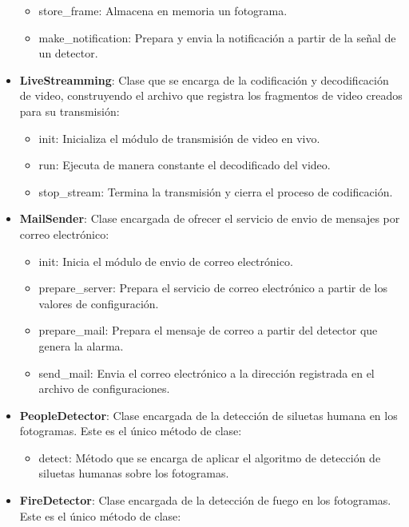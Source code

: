 \begin{itemize}
\begin{itemize}
            \item store\_frame: Almacena en memoria un fotograma.
            \item make\_notification: Prepara y envia la notificación a partir de la señal de un detector.
        \end{itemize}
    \item \textbf{LiveStreamming}: Clase que se encarga de la codificación y decodificación de video, construyendo el archivo que registra los fragmentos de video creados para su transmisión:
        \begin{itemize}
            \item init: Inicializa el módulo de transmisión de video en vivo.
            \item run: Ejecuta de manera constante el decodificado del video.
            \item stop\_stream: Termina la transmisión y cierra el proceso de codificación.
        \end{itemize}
    \item \textbf{MailSender}: Clase encargada de ofrecer el servicio de envio de mensajes por correo electrónico:
        \begin{itemize}
            \item init: Inicia el módulo de envio de correo electrónico.
            \item prepare\_server: Prepara el servicio de correo electrónico a partir de los valores de configuración.
            \item prepare\_mail: Prepara el mensaje de correo a partir del detector que genera la alarma.
            \item send\_mail: Envia el correo electrónico a la dirección registrada en el archivo de configuraciones.
        \end{itemize}
    \item \textbf{PeopleDetector}: Clase encargada de la detección de siluetas humana en los fotogramas. Este es el único método de clase:
        \begin{itemize}
            \item detect: Método que se encarga de aplicar el algoritmo de detección de siluetas humanas sobre los fotogramas.
        \end{itemize}
    \item \textbf{FireDetector}: Clase encargada de la detección de fuego en los fotogramas. Este es el único método de clase:
        \begin{itemize}

\end{itemize}
\end{itemize}
